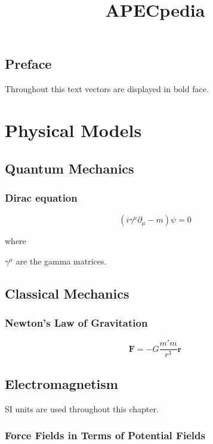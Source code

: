 \documentclass[english]{book}
\title{APECpedia}
\begin{document}
\maketitle

\tableofcontents

\chapter*{Preface} \nonumber

Throughout this text vectors are displayed in bold face.


\part{Physical Models}


\chapter{Quantum Mechanics}

\section{Dirac equation}

\[
\left( i \gamma^{\mu}\partial_{\mu} - m \right) \psi = 0
\]

where

$\gamma^{\mu}$ are the gamma matrices.

\chapter{Classical Mechanics}

\section{Newton's Law of Gravitation}

\[
\mathbf{F} = -G \frac{m'm}{r^3} \mathbf{r}
\]

\chapter{Electromagnetism}

SI units are used throughout this chapter.

\section{Force Fields in Terms of Potential Fields}
\end{document}
